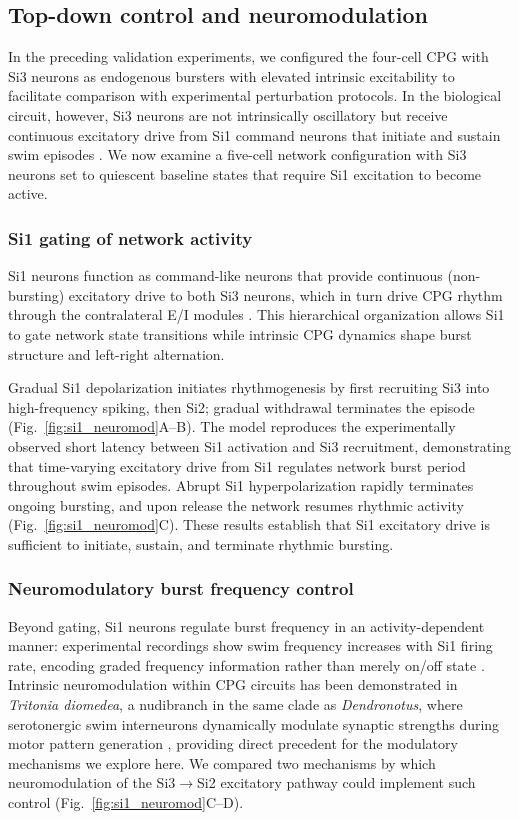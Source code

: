 \subsection{Top-down control and neuromodulation}

In the preceding validation experiments, we configured the four-cell CPG with Si3 neurons as endogenous bursters with elevated intrinsic excitability to facilitate comparison with experimental perturbation protocols.
In the biological circuit, however, Si3 neurons are not intrinsically oscillatory but receive continuous excitatory drive from Si1 command neurons that initiate and sustain swim episodes \cite{sakurai2019command}.
We now examine a five-cell network configuration with Si3 neurons set to quiescent baseline states that require Si1 excitation to become active.

\subsubsection{Si1 gating of network activity}

Si1 neurons function as command-like neurons that provide continuous (non-bursting) excitatory drive to both Si3 neurons, which in turn drive CPG rhythm through the contralateral E/I modules \cite{sakurai2019command}.
This hierarchical organization allows Si1 to gate network state transitions while intrinsic CPG dynamics shape burst structure and left-right alternation.

Gradual Si1 depolarization initiates rhythmogenesis by first recruiting Si3 into high-frequency spiking, then Si2; gradual withdrawal terminates the episode (Fig.~\ref{fig:si1_neuromod}A--B).
The model reproduces the experimentally observed short latency between Si1 activation and Si3 recruitment, demonstrating that time-varying excitatory drive from Si1 regulates network burst period throughout swim episodes.
Abrupt Si1 hyperpolarization rapidly terminates ongoing bursting, and upon release the network resumes rhythmic activity (Fig.~\ref{fig:si1_neuromod}C).
These results establish that Si1 excitatory drive is sufficient to initiate, sustain, and terminate rhythmic bursting.

\subsubsection{Neuromodulatory burst frequency control}

Beyond gating, Si1 neurons regulate burst frequency in an activity-dependent manner: experimental recordings show swim frequency increases with Si1 firing rate, encoding graded frequency information rather than merely on/off state \cite{sakurai2019command}.
Intrinsic neuromodulation within CPG circuits has been demonstrated in \textit{Tritonia diomedea}, a nudibranch in the same clade as \textit{Dendronotus}, where serotonergic swim interneurons dynamically modulate synaptic strengths during motor pattern generation \cite{katz1994dynamic, sakurai2003spike}, providing direct precedent for the modulatory mechanisms we explore here.
We compared two mechanisms by which neuromodulation of the Si3$\to$Si2 excitatory pathway could implement such control (Fig.~\ref{fig:si1_neuromod}C--D).


